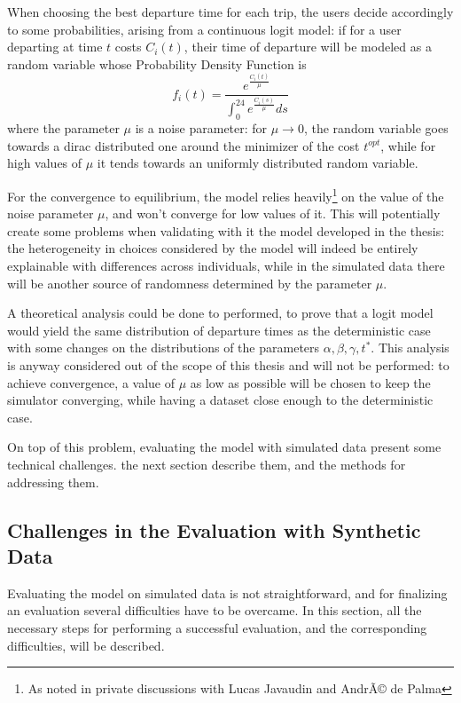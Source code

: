 When choosing the best departure time for each trip,
the users decide accordingly to some probabilities, arising from a continuous logit model:
if for a user departing at time \(t\) costs \(C_i(t)\),
their time of departure will be modeled as a random variable whose Probability Density Function is
\begin{equation}
  \label{eq:cost_logit}
  f_i(t) = \frac{e^{\frac{C_i(t)}{\mu}}}{\int_0^{24}e^{\frac{C_i(s)}{\mu}}ds}
\end{equation}
where the parameter \(\mu\) is a noise parameter:
for \(\mu \rightarrow 0\), the random variable goes towards a dirac distributed one around the minimizer of the cost \(t^{opt}\),
while for high values of \(\mu\) it tends towards an uniformly distributed random variable.

For the convergence to equilibrium, the model relies heavily\footnote{As noted in private discussions with Lucas Javaudin and AndrÃ© de Palma} on the value of the noise parameter \(\mu\),
and won't converge for low values of it.
This will potentially create some problems when validating with it the model developed in the thesis:
the heterogeneity in choices considered by the model will indeed be entirely explainable with differences across individuals,
while in the simulated data there will be another source of randomness determined by the parameter \(\mu\).

A theoretical analysis could be done to performed,
to prove that a logit model would yield the same distribution of departure times as the deterministic case with some changes on the distributions of the parameters \(\alpha, \beta, \gamma, t^*\).
This analysis is anyway considered out of the scope of this thesis and will not be performed:
to achieve convergence,
a value of \(\mu\) as low as possible will be chosen to keep the simulator converging,
while having a dataset close enough to the deterministic case.

On top of this problem, evaluating the model with simulated data present some technical challenges.
the next section describe them, and the methods for addressing them.

\subsection{Challenges in the Evaluation with Synthetic Data}
\label{sec:sim_tech}

Evaluating the model on simulated data is not straightforward,
and for finalizing an evaluation several difficulties have to be overcame.
In this section, all the necessary steps for performing a successful evaluation,
and the corresponding difficulties, will be described.


